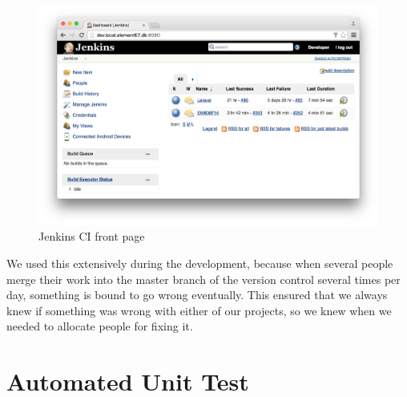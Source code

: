 \begin{figure}[!htbp]
    \centering
    \includegraphics[width=\textwidth]{graphic/quality_assurance/jenkins_frontpage.png}
    \caption{Jenkins CI front page}
    \label{fig:jenkins_front_page}
\end{figure}
\FloatBarrier

We used this extensively during the development, because when several people merge their work into the master branch of the version control several times per day, something is bound to go wrong eventually. This ensured that we always knew if something was wrong with either of our projects, so we knew when we needed to allocate people for fixing it. 


\section{Automated Unit Test}
\label{sec:automated_unit_test}

